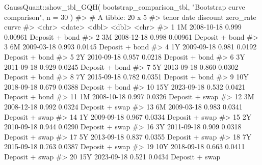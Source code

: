 \documentclass[
  letterpaper,
  DIV=11,
  numbers=noendperiod]{scrreprt}
\newenvironment{Shaded}{\begin{snugshade}}{\end{snugshade}}
\newcommand{\AttributeTok}[1]{\textcolor[rgb]{0.40,0.45,0.13}{#1}}
\newcommand{\CommentTok}[1]{\textcolor[rgb]{0.37,0.37,0.37}{#1}}
\newcommand{\DecValTok}[1]{\textcolor[rgb]{0.68,0.00,0.00}{#1}}
\newcommand{\FunctionTok}[1]{\textcolor[rgb]{0.28,0.35,0.67}{#1}}
\newcommand{\NormalTok}[1]{\textcolor[rgb]{0.00,0.23,0.31}{#1}}
\newcommand{\SpecialCharTok}[1]{\textcolor[rgb]{0.37,0.37,0.37}{#1}}
\newcommand{\StringTok}[1]{\textcolor[rgb]{0.13,0.47,0.30}{#1}}
\begin{document}
\begin{Shaded}
\begin{Highlighting}[]
\NormalTok{GaussQuant}\SpecialCharTok{::}\FunctionTok{show\_tbl\_GQH}\NormalTok{(}
\NormalTok{  bootstrap\_comparison\_tbl,}
  \StringTok{"Bootstrap curve comparison"}\NormalTok{,}
  \AttributeTok{n =} \DecValTok{30}
\NormalTok{)}
\CommentTok{\#\textgreater{} \# A tibble: 20 x 5}
\CommentTok{\#\textgreater{}    tenor date       discount zero\_rate curve         }
\CommentTok{\#\textgreater{}    \textless{}chr\textgreater{} \textless{}date\textgreater{}        \textless{}dbl\textgreater{}     \textless{}dbl\textgreater{} \textless{}chr\textgreater{}         }
\CommentTok{\#\textgreater{}  1 1M    2008{-}10{-}18    0.999   0.00961 Deposit + bond}
\CommentTok{\#\textgreater{}  2 3M    2008{-}12{-}18    0.998   0.00961 Deposit + bond}
\CommentTok{\#\textgreater{}  3 6M    2009{-}03{-}18    0.993   0.0145  Deposit + bond}
\CommentTok{\#\textgreater{}  4 1Y    2009{-}09{-}18    0.981   0.0192  Deposit + bond}
\CommentTok{\#\textgreater{}  5 2Y    2010{-}09{-}18    0.957   0.0218  Deposit + bond}
\CommentTok{\#\textgreater{}  6 3Y    2011{-}09{-}18    0.929   0.0245  Deposit + bond}
\CommentTok{\#\textgreater{}  7 5Y    2013{-}09{-}18    0.860   0.0302  Deposit + bond}
\CommentTok{\#\textgreater{}  8 7Y    2015{-}09{-}18    0.782   0.0351  Deposit + bond}
\CommentTok{\#\textgreater{}  9 10Y   2018{-}09{-}18    0.679   0.0388  Deposit + bond}
\CommentTok{\#\textgreater{} 10 15Y   2023{-}09{-}18    0.532   0.0421  Deposit + bond}
\CommentTok{\#\textgreater{} 11 1M    2008{-}10{-}18    0.997   0.0326  Deposit + swap}
\CommentTok{\#\textgreater{} 12 3M    2008{-}12{-}18    0.992   0.0324  Deposit + swap}
\CommentTok{\#\textgreater{} 13 6M    2009{-}03{-}18    0.983   0.0341  Deposit + swap}
\CommentTok{\#\textgreater{} 14 1Y    2009{-}09{-}18    0.967   0.0334  Deposit + swap}
\CommentTok{\#\textgreater{} 15 2Y    2010{-}09{-}18    0.944   0.0290  Deposit + swap}
\CommentTok{\#\textgreater{} 16 3Y    2011{-}09{-}18    0.909   0.0318  Deposit + swap}
\CommentTok{\#\textgreater{} 17 5Y    2013{-}09{-}18    0.837   0.0355  Deposit + swap}
\CommentTok{\#\textgreater{} 18 7Y    2015{-}09{-}18    0.763   0.0387  Deposit + swap}
\CommentTok{\#\textgreater{} 19 10Y   2018{-}09{-}18    0.663   0.0411  Deposit + swap}
\CommentTok{\#\textgreater{} 20 15Y   2023{-}09{-}18    0.521   0.0434  Deposit + swap}


\end{Highlighting}
\end{Shaded}
\end{document}

